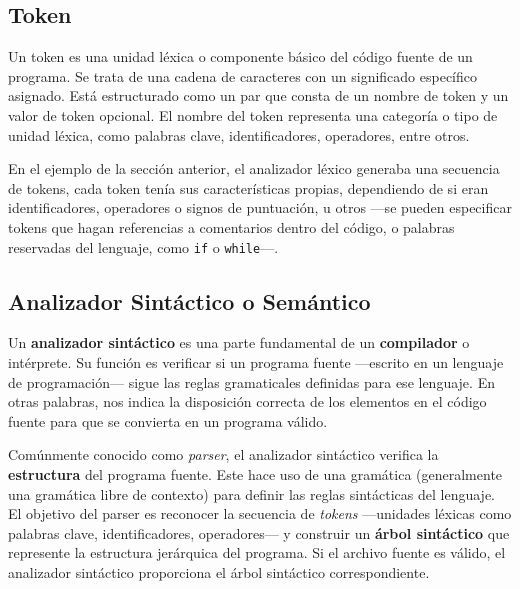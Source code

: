 \lstset{inputencoding=utf8/latin1}


\subsection{Token}
\noindent Un token es una unidad léxica o componente básico del código fuente de un programa. Se trata de una cadena de caracteres con un significado específico asignado. Está estructurado como un par que consta de un nombre de token y un valor de token opcional. El nombre del token representa una categoría o tipo de unidad léxica, como palabras clave, identificadores, operadores, entre otros\cite{token}.

En el ejemplo de la sección anterior, el analizador léxico generaba una secuencia de tokens, cada token tenía sus características propias, dependiendo de si eran identificadores, operadores o signos de puntuación, u otros ---se pueden especificar tokens que hagan referencias a comentarios dentro del código, o palabras reservadas del lenguaje, como \lstinline[keywordstyle=\color{black}]|if| o \lstinline[keywordstyle=\color{black}]|while|---.


\subsection{Analizador Sintáctico o Semántico}
\noindent Un \textbf{analizador sintáctico} es una parte fundamental de un \textbf{compilador} o intérprete. Su función es verificar si un programa fuente ---escrito en un lenguaje de programación--- sigue las reglas gramaticales definidas para ese lenguaje\cite{analizadorsintactico}. En otras palabras, nos indica la disposición correcta de los elementos en el código fuente para que se convierta en un programa válido.

Comúnmente conocido como \textit{parser}, el analizador sintáctico verifica la \textbf{estructura} del programa fuente. Este hace uso de una gramática (generalmente una gramática libre de contexto) para definir las reglas sintácticas del lenguaje. El objetivo del parser es reconocer la secuencia de \textit{tokens} ---unidades léxicas como palabras clave, identificadores, operadores--- y construir un \textbf{árbol sintáctico} que represente la estructura jerárquica del programa. Si el archivo fuente es válido, el analizador sintáctico proporciona el árbol sintáctico correspondiente.

